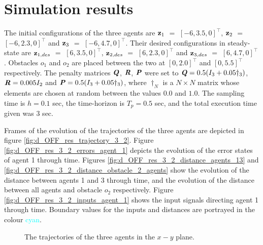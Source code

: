 \section{Simulation results}

The initial configurations of the three agents are
$\bm{\mathbf{z}}_1$ $=$ $[-6, 3.5, 0]^{\top}$,
$\bm{\mathbf{z}}_2$ $=$ $[-6, 2.3, 0]^{\top}$ and
$\bm{\mathbf{z}}_3$ $=$ $[-6, 4.7, 0]^{\top}$.
Their desired configurations in steady-state are
$\bm{\mathbf{z}}_{1,des}$ $=$ $[6, 3.5, 0]^{\top}$,
$\bm{\mathbf{z}}_{2,des}$ $=$ $[6, 2.3, 0]^{\top}$ and
$\bm{\mathbf{z}}_{3,des}$ $=$ $[6, 4.7, 0]^{\top}$.
Obstacles $o_1$ and $o_2$ are placed between the two at $[0, 2.0]^{\top}$
and $[0, 5.5]^{\top}$ respectively. The penalty
matrices $\bm{\mathit{Q}}$, $\bm{\mathit{R}}$, $\bm{\mathit{P}}$ were set to
$\bm{\mathit{Q}} = 0.5 (I_3 + 0.05\dagger_3)$, $\bm{\mathit{R}} = 0.005 I_2$ and
$\bm{\mathit{P}} = 0.5 (I_3 + 0.05\dagger_3)$, where $\dagger_N$ is a $N \times N$
matrix whose elements are chosen at random between the values $0.0$ and $1.0$.
The sampling time is $h = 0.1$ sec, the time-horizon is $T_p = 0.5$ sec, and
the total execution time given was $3$ sec.

Frames of the evolution of the trajectories of the three agents are depicted in
figure \eqref{fig:d_OFF_res_trajectory_3_2}.
Figure \eqref{fig:d_OFF_res_3_2_errors_agent_1} depicts the evolution of the
error states of agent 1 through time.
Figures \eqref{fig:d_OFF_res_3_2_distance_agents_13} and
\eqref{fig:d_OFF_res_3_2_distance_obstacle_2_agents} show the evolution of the
distance between agents 1 and 3 through time, and the evolution of the
distance between all agents and obstacle $o_2$ respectively.
Figure \eqref{fig:d_OFF_res_3_2_inputs_agent_1} shows the input signals
directing agent 1 through time. Boundary values for the inputs and
distances are portrayed in the colour \textcolor{cyan}{cyan}.



\begin{figure}[H]
  
  \caption{The trajectories of the three agents in the $x-y$ plane.}
  \label{fig:d_OFF_res_trajectory_3_2}
\end{figure}


